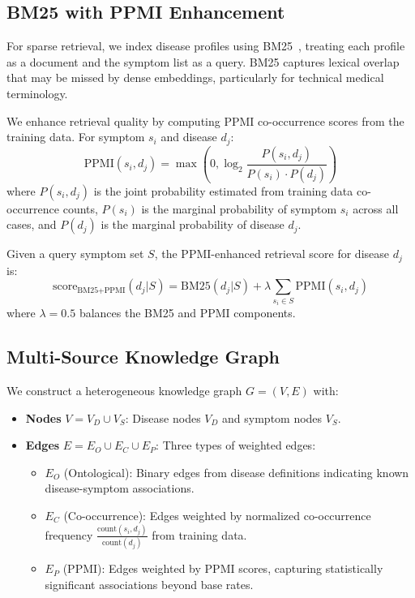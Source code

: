 \documentclass[review]{elsarticle}
\begin{document}
\subsection{BM25 with PPMI Enhancement}
\label{sec:bm25}

For sparse retrieval, we index disease profiles using BM25~\cite{robertson2009probabilistic}, treating each profile as a document and the symptom list as a query. BM25 captures lexical overlap that may be missed by dense embeddings, particularly for technical medical terminology.

We enhance retrieval quality by computing PPMI co-occurrence scores from the training data. For symptom $s_i$ and disease $d_j$:
\begin{equation}
    \text{PPMI}(s_i, d_j) = \max\left(0, \log_2 \frac{P(s_i, d_j)}{P(s_i) \cdot P(d_j)}\right)
\end{equation}
where $P(s_i, d_j)$ is the joint probability estimated from training data co-occurrence counts, $P(s_i)$ is the marginal probability of symptom $s_i$ across all cases, and $P(d_j)$ is the marginal probability of disease $d_j$.

Given a query symptom set $S$, the PPMI-enhanced retrieval score for disease $d_j$ is:
\begin{equation}
    \text{score}_{\text{BM25+PPMI}}(d_j | S) = \text{BM25}(d_j | S) + \lambda \sum_{s_i \in S} \text{PPMI}(s_i, d_j)
\end{equation}
where $\lambda = 0.5$ balances the BM25 and PPMI components.

\subsection{Multi-Source Knowledge Graph}
\label{sec:kg}

We construct a heterogeneous knowledge graph $G = (V, E)$ with:
\begin{itemize}
    \item \textbf{Nodes} $V = V_D \cup V_S$: Disease nodes $V_D$ and symptom nodes $V_S$.
    \item \textbf{Edges} $E = E_O \cup E_C \cup E_P$: Three types of weighted edges:
    \begin{itemize}
        \item $E_O$ (Ontological): Binary edges from disease definitions indicating known disease-symptom associations.
        \item $E_C$ (Co-occurrence): Edges weighted by normalized co-occurrence frequency $\frac{\text{count}(s_i, d_j)}{\text{count}(d_j)}$ from training data.
        \item $E_P$ (PPMI): Edges weighted by PPMI scores, capturing statistically significant associations beyond base rates.
    \end{itemize}
\end{itemize}
\end{document}
